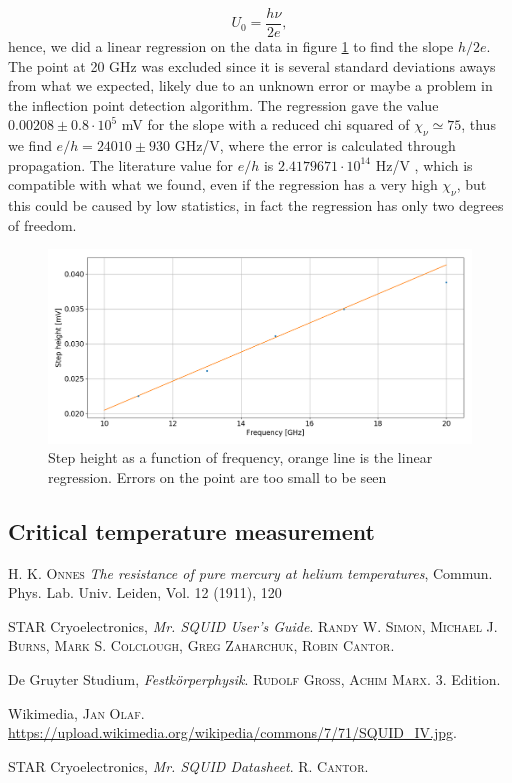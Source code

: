 \documentclass[a4paper,10pt]{article}
\begin{document}
\[U_0 = \frac{h\nu}{2e},\]
hence, we did a linear regression on the data in figure \ref{eh} to find the slope $h/2e$. The point at 20 GHz was excluded since it is several standard deviations aways from what we expected, likely due to an unknown error or maybe a problem in the inflection point detection algorithm. The regression gave the value $0.00208\pm 0.8\cdot 10^5$ mV for the slope with a reduced chi squared of $\chi_\nu \simeq 75$, thus we find $e/h = 24010 \pm 930$ GHz/V, where the error is calculated through propagation. The literature value for $e/h$ is $ 2.4179671\cdot 10^{14}$ Hz/V \cite{skriptum}, which is compatible with what we found, even if the regression has a very high $\chi_\nu$, but this could be caused by low statistics, in fact the regression has only two degrees of freedom.
\begin{figure}[H]
\centering
\includegraphics[width = \textwidth]{eh}
\caption{Step height as a function of frequency, orange line is the linear regression. Errors on the point are too small to be seen}\label{eh}
\end{figure}
\subsection{Critical temperature measurement}

\begin{thebibliography}{99}
 \textsc{H. K. Onnes} \textit{The resistance of pure mercury at helium temperatures}, Commun. Phys. Lab. Univ. Leiden, Vol. 12 (1911), 120 

STAR Cryoelectronics, \textit{Mr. SQUID User's  Guide}. \textsc{Randy W. Simon, Michael J. Burns, Mark S. Colclough, Greg Zaharchuk, Robin Cantor}. 

De Gruyter Studium, \textit{Festkörperphysik}. \textsc{Rudolf Gross, Achim Marx}. 3. Edition.

Wikimedia, \textsc{Jan Olaf}. \url{https://upload.wikimedia.org/wikipedia/commons/7/71/SQUID_IV.jpg}.

STAR Cryoelectronics, \textit{Mr. SQUID Datasheet}. \textsc{R. Cantor}. 

\end{thebibliography}
\end{document}
